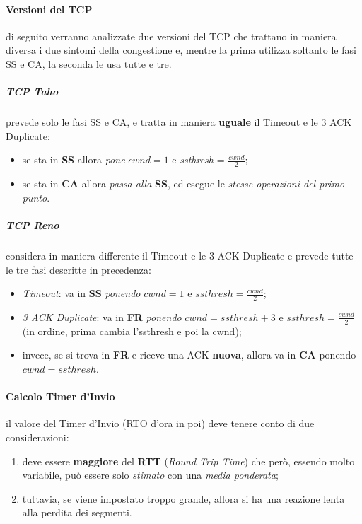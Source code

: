 \documentclass[a4paper]{article}
\begin{document}
				\paragraph{Versioni del TCP}
					di seguito verranno analizzate due versioni del TCP che trattano in maniera diversa i due sintomi della congestione e, mentre la prima utilizza soltanto le fasi SS e CA, la seconda le usa tutte e tre.
					
					\subparagraph{TCP Taho}
						prevede solo le fasi SS e CA, e tratta in maniera \textbf{uguale} il Timeout e le 3 ACK Duplicate:
						\begin{itemize}
							\item se sta in \textbf{SS} allora \emph{pone} \( cwnd = 1 \) e \emph{ssthresh} = \( \frac{cwnd}{2} \);
							\item se sta in \textbf{CA} allora \emph{passa alla} \textbf{SS}, ed esegue le \emph{stesse operazioni del primo punto}.
						\end{itemize}
						
					\subparagraph{TCP Reno}
						considera in maniera differente il Timeout e le 3 ACK Duplicate e prevede tutte le tre fasi descritte in precedenza:
						\begin{itemize}
							\item \emph{Timeout}: va in \textbf{SS} \emph{ponendo} \( cwnd = 1 \) e \( ssthresh = \frac{cwnd}{2} \);
							\item \emph{3 ACK Duplicate}: va in \textbf{FR} \emph{ponendo} \( cwnd = ssthresh + 3 \) e \(ssthresh = \frac{cwnd}{2} \) (in ordine, prima cambia l'ssthresh e poi la cwnd);
							\item invece, se si trova in \textbf{FR} e riceve una ACK \textbf{nuova}, allora va in \textbf{CA} ponendo \( cwnd = ssthresh \).
						\end{itemize}
					
				\paragraph{Calcolo Timer d'Invio}
					il valore del Timer d'Invio (RTO d'ora in poi) deve tenere conto di due considerazioni:
					\begin{enumerate}
						\item deve essere \textbf{maggiore} del \textbf{RTT} (\emph{Round Trip Time}) che però, essendo molto variabile, può essere solo \emph{stimato} con una \emph{media ponderata};
						\item tuttavia, se viene impostato troppo grande, allora si ha una reazione lenta alla perdita dei segmenti.
					\end{enumerate}					 
					
\end{document}
